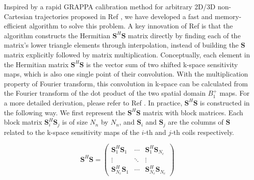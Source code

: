 \par Inspired by a rapid GRAPPA calibration method for arbitrary 2D/3D non-Cartesian trajectories proposed in Ref \cite{luo2019grappa}, we have developed a fast and memory-efficient algorithm to solve this problem. A key innovation of Ref \cite{luo2019grappa} is that the algorithm constructs the Hermitian $\mathbf{S}^{H}\mathbf{S}$ matrix directly by finding each of the matrix's lower triangle elements through interpolation, instead of building the $\mathbf{S}$ matrix explicitly followed by matrix multiplication. Conceptually, each element in the Hermitian matrix $\mathbf{S}^{H}\mathbf{S}$ is the vector sum of two shifted k-space sensitivity maps, which is also one single point of their convolution. With the multiplication property of Fourier transform, this convolution in k-space can be calculated from the Fourier transform of the dot product of the two spatial domain $B_1^+$ maps. For a more detailed derivation, please refer to Ref \cite{luo2019grappa}.
In practice, $\mathbf{S}^{H}\mathbf{S}$ is constructed in the following way. We first represent the $\mathbf{S}^{H}\mathbf{S}$ matrix with block matrices. Each block matrix $\mathbf{S}_i^{H}\mathbf{S}_j$ is of size $N_n$ by $N_n$, and $\mathbf{S}_i$ and $\mathbf{S}_j$ are the columns of $\mathbf{S}$ related to the k-space sensitivity maps of the $i$-th and $j$-th coils respectively.

\begin{equation}
\mathbf{S}^{H}\mathbf{S} = 
\begin{pmatrix}
\mathbf{S}_1^{H}\mathbf{S}_1 & \cdots & \mathbf{S}_1^{H}\mathbf{S}_{N_c} \\
\vdots  &  \ddots & \vdots  \\
\mathbf{S}_{N_c}^{H}\mathbf{S}_1 & \cdots & \mathbf{S}_{N_c}^{H}\mathbf{S}_{N_c} 
\end{pmatrix}
\end{equation}

